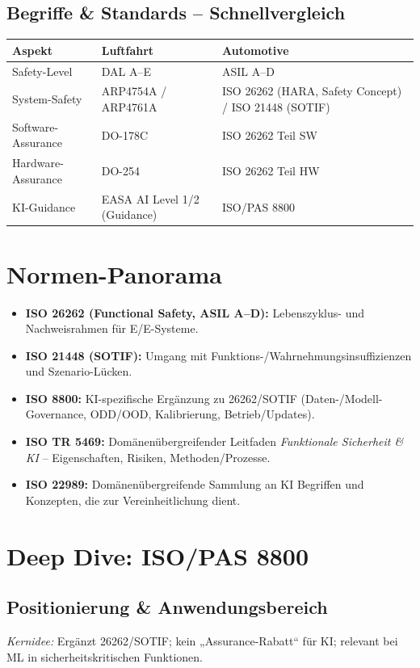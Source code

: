 \subsection{Begriffe \& Standards – Schnellvergleich}
\begin{center}
\begin{tabular}{p{} p{} p{}}
\hline
\textbf{Aspekt} & \textbf{Luftfahrt} & \textbf{Automotive} \\
\hline
Safety-Level & DAL A–E & ASIL A–D \\
System-Safety & ARP4754A / ARP4761A & ISO 26262 (HARA, Safety Concept) / ISO 21448 (SOTIF) \\
Software-Assurance & DO-178C & ISO 26262 Teil SW \\
Hardware-Assurance & DO-254 & ISO 26262 Teil HW \\
KI-Guidance & EASA AI Level 1/2 (Guidance) & ISO/PAS 8800 \\
\hline
\end{tabular}
\end{center}

\section{Normen-Panorama}
\begin{itemize}
  \item \textbf{ISO 26262 (Functional Safety, ASIL A–D):} Lebenszyklus- und Nachweisrahmen für E/E-Systeme.
  \item \textbf{ISO 21448 (SOTIF):} Umgang mit Funktions-/Wahrnehmungs­insuffizienzen und Szenario-Lücken.
  \item \textbf{ISO 8800:} KI-spezifische Ergänzung zu 26262/SOTIF (Daten-/Modell-Governance, ODD/OOD, Kalibrierung, Betrieb/Updates).
  \item \textbf{ISO TR 5469:} Domänenübergreifender Leitfaden \emph{Funktionale Sicherheit \& KI} – Eigenschaften, Risiken, Methoden/Prozesse.
  \item \textbf{ISO 22989:} Domänenübergreifende Sammlung an KI Begriffen und Konzepten, die zur Vereinheitlichung dient.
\end{itemize}

\section{Deep Dive: ISO/PAS 8800}
\subsection{Positionierung \& Anwendungsbereich}
\textit{Kernidee:} Ergänzt 26262/SOTIF; kein „Assurance-Rabatt“ für KI; relevant bei ML in sicherheitskritischen Funktionen.

